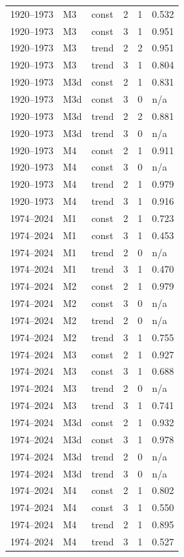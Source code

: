 \documentclass[11pt]{article}
\begin{document}
\begin{longtable}{p{2.6cm}p{1.6cm}p{1.8cm}p{1.2cm}p{2.2cm}p{3.0cm}}
1920--1973 & M3 & const & 2 & 1 & 0.532 \\
1920--1973 & M3 & const & 3 & 1 & 0.951 \\
1920--1973 & M3 & trend & 2 & 2 & 0.951 \\
1920--1973 & M3 & trend & 3 & 1 & 0.804 \\
1920--1973 & M3d & const & 2 & 1 & 0.831 \\
1920--1973 & M3d & const & 3 & 0 & n/a \\
1920--1973 & M3d & trend & 2 & 2 & 0.881 \\
1920--1973 & M3d & trend & 3 & 0 & n/a \\
1920--1973 & M4 & const & 2 & 1 & 0.911 \\
1920--1973 & M4 & const & 3 & 0 & n/a \\
1920--1973 & M4 & trend & 2 & 1 & 0.979 \\
1920--1973 & M4 & trend & 3 & 1 & 0.916 \\
1974--2024 & M1 & const & 2 & 1 & 0.723 \\
1974--2024 & M1 & const & 3 & 1 & 0.453 \\
1974--2024 & M1 & trend & 2 & 0 & n/a \\
1974--2024 & M1 & trend & 3 & 1 & 0.470 \\
1974--2024 & M2 & const & 2 & 1 & 0.979 \\
1974--2024 & M2 & const & 3 & 0 & n/a \\
1974--2024 & M2 & trend & 2 & 0 & n/a \\
1974--2024 & M2 & trend & 3 & 1 & 0.755 \\
1974--2024 & M3 & const & 2 & 1 & 0.927 \\
1974--2024 & M3 & const & 3 & 1 & 0.688 \\
1974--2024 & M3 & trend & 2 & 0 & n/a \\
1974--2024 & M3 & trend & 3 & 1 & 0.741 \\
1974--2024 & M3d & const & 2 & 1 & 0.932 \\
1974--2024 & M3d & const & 3 & 1 & 0.978 \\
1974--2024 & M3d & trend & 2 & 0 & n/a \\
1974--2024 & M3d & trend & 3 & 0 & n/a \\
1974--2024 & M4 & const & 2 & 1 & 0.802 \\
1974--2024 & M4 & const & 3 & 1 & 0.550 \\
1974--2024 & M4 & trend & 2 & 1 & 0.895 \\
1974--2024 & M4 & trend & 3 & 1 & 0.527 \\
\bottomrule
\end{longtable}
\normalsize
\end{document}

